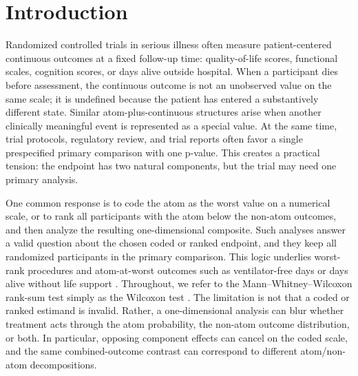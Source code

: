 \documentclass[11pt]{article}
\begin{document}
\section{Introduction}

Randomized controlled trials in serious illness often measure patient-centered continuous outcomes at a fixed follow-up time: quality-of-life scores, functional scales, cognition scores, or days alive outside hospital. When a participant dies before assessment, the continuous outcome is not an unobserved value on the same scale; it is undefined because the patient has entered a substantively different state. Similar atom-plus-continuous structures arise when another clinically meaningful event is represented as a special value. At the same time, trial protocols, regulatory review, and trial reports often favor a single prespecified primary comparison with one p-value. This creates a practical tension: the endpoint has two natural components, but the trial may need one primary analysis.

One common response is to code the atom as the worst value on a numerical scale, or to rank all participants with the atom below the non-atom outcomes, and then analyze the resulting one-dimensional composite. Such analyses answer a valid question about the chosen coded or ranked endpoint, and they keep all randomized participants in the primary comparison. This logic underlies worst-rank procedures and atom-at-worst outcomes such as ventilator-free days or days alive without life support \citep{Lachin_1999,McMahon_2000,Colantuoni_2018,10.1001/jama.2021.18295,Yehya_2019}. Throughout, we refer to the Mann--Whitney--Wilcoxon rank-sum test simply as the Wilcoxon test \citep{wilcoxon3001968individual,mann1947test}. The limitation is not that a coded or ranked estimand is invalid. Rather, a one-dimensional analysis can blur whether treatment acts through the atom probability, the non-atom outcome distribution, or both. In particular, opposing component effects can cancel on the coded scale, and the same combined-outcome contrast can correspond to different atom/non-atom decompositions.
\end{document}

